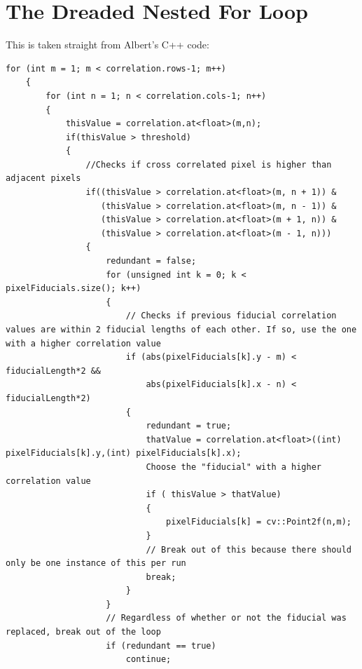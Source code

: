 \documentclass[10pt]{scrartcl}
\begin{document}

\clearpage

\section{The Dreaded Nested For Loop} %
\label{sec:the_dreaded_nested_for_loop}
This is taken straight from Albert's C++ code:

\begin{lstlisting}
for (int m = 1; m < correlation.rows-1; m++)
    {
        for (int n = 1; n < correlation.cols-1; n++)
        {        
            thisValue = correlation.at<float>(m,n);
            if(thisValue > threshold)
            {
                //Checks if cross correlated pixel is higher than adjacent pixels                
                if((thisValue > correlation.at<float>(m, n + 1)) &
                   (thisValue > correlation.at<float>(m, n - 1)) &
                   (thisValue > correlation.at<float>(m + 1, n)) &
                   (thisValue > correlation.at<float>(m - 1, n)))
                {
                    redundant = false;
                    for (unsigned int k = 0; k <  pixelFiducials.size(); k++)
                    {
                        // Checks if previous fiducial correlation values are within 2 fiducial lengths of each other. If so, use the one with a higher correlation value
                        if (abs(pixelFiducials[k].y - m) < fiducialLength*2 &&
                            abs(pixelFiducials[k].x - n) < fiducialLength*2)
                        {
                            redundant = true;
                            thatValue = correlation.at<float>((int) pixelFiducials[k].y,(int) pixelFiducials[k].x);
                            Choose the "fiducial" with a higher correlation value
                            if ( thisValue > thatValue)
                            {
                                pixelFiducials[k] = cv::Point2f(n,m);
                            }
                            // Break out of this because there should only be one instance of this per run
                            break;
                        }
                    }
                    // Regardless of whether or not the fiducial was replaced, break out of the loop
                    if (redundant == true)
                        continue;


\end{lstlisting}
\end{document}
